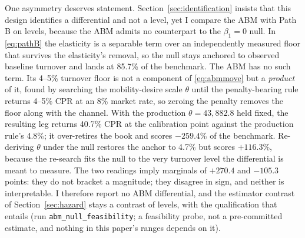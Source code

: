One asymmetry deserves statement. Section~\ref{sec:identification} insists that this design identifies a differential and not a level, yet I compare the ABM with Path B on levels, because the ABM admits no counterpart to the $\beta_1 = 0$ null. In \eqref{eq:pathB} the elasticity is a separable term over an independently measured floor that survives the elasticity's removal, so the null stays anchored to observed baseline turnover and lands at 85.7\% of the benchmark. The ABM has no such term. Its 4--5\% turnover floor is not a component of \eqref{eq:abmmove} but a \emph{product} of it, found by searching the mobility-desire scale $\theta$ until the penalty-bearing rule returns 4--5\% CPR at an 8\% market rate, so zeroing the penalty removes the floor along with the channel. With the production $\theta = 43{,}882.8$ held fixed, the resulting leg returns 40.7\% CPR at the calibration point against the production rule's 4.8\%; it over-retires the book and scores $-259.4$\% of the benchmark. Re-deriving $\theta$ under the null restores the anchor to 4.7\% but scores $+116.3$\%, because the re-search fits the null to the very turnover level the differential is meant to measure. The two readings imply marginals of $+270.4$ and $-105.3$ points: they do not bracket a magnitude; they disagree in sign, and neither is interpretable. I therefore report no ABM differential, and the estimator contrast of Section~\ref{sec:hazard} stays a contrast of levels, with the qualification that entails (run \texttt{abm\_null\_feasibility}; a feasibility probe, not a pre-committed estimate, and nothing in this paper's ranges depends on it).
